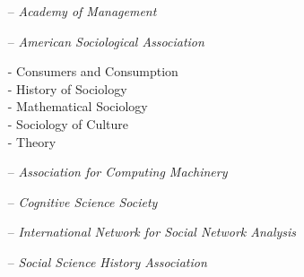 
\setlength\multicolsep{0pt}
\begin{itemize}[itemsep=-0.5ex]
    \item[--] {\em Academy of Management}
    \item[--] {\em American Sociological Association}
        \begin{multicols}{2}
            \noindent
            \footnotesize
            - Consumers and Consumption \\
            - History of Sociology \\
            - Mathematical Sociology \\
            - Sociology of Culture \\
            - Theory
        \end{multicols}
    \item[--] \emph{Association for Computing Machinery}
    \item[--] \emph{Cognitive Science Society}
    \item[--] \emph{International Network for Social Network Analysis}
    \item[--] {\em Social Science History Association}
\end{itemize}




